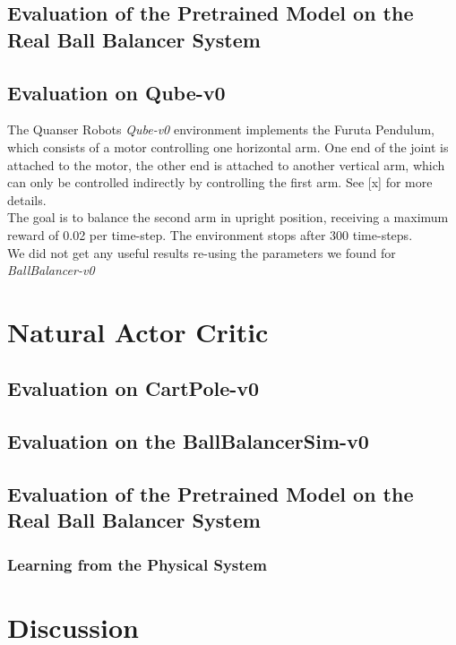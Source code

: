 \subsection{Evaluation of the Pretrained Model on the Real Ball Balancer System}

\subsection{Evaluation on Qube-v0}
The Quanser Robots \textit{Qube-v0} environment implements the Furuta Pendulum, which consists of a motor controlling one horizontal arm. One end of the joint is attached to the motor, the other end is attached to another vertical arm, which can only be controlled indirectly by controlling the first arm. See [x] for more details.\\
The goal is to balance the second arm in upright position, receiving a maximum reward of 0.02 per time-step. The environment stops after 300 time-steps.\\
We did not get any useful results re-using the parameters we found for \textit{BallBalancer-v0} 
\section{Natural Actor Critic}
\label{sec:nac}
\subsection{Evaluation on CartPole-v0}
\subsection{Evaluation on the BallBalancerSim-v0}
\subsection{Evaluation of the Pretrained Model on the Real Ball Balancer System}
\subsubsection{Learning from the Physical System}

\section{Discussion}
\label{sec:conclusion}






